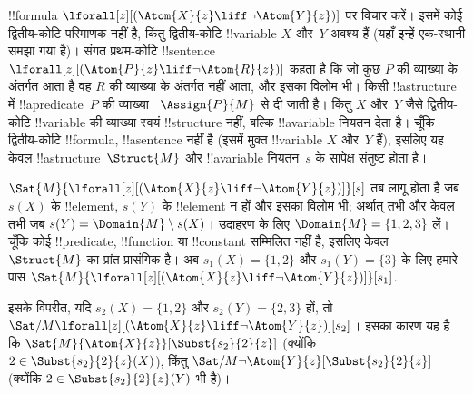 \documentclass[../../../include/open-logic-section]{subfiles}
\begin{document}
\begin{ex}
  !!{formula} $\lforall[z][(\Atom{X}{z} \liff \lnot
    \Atom{Y}{z})]$ पर विचार करें। इसमें कोई द्वितीय-कोटि परिमाणक नहीं है,
  किंतु द्वितीय-कोटि !!{variable} $X$ और~$Y$ अवश्य हैं (यहाँ इन्हें एक-स्थानी
  समझा गया है)। संगत प्रथम-कोटि !!{sentence}
  $\lforall[z][(\Atom{P}{z} \liff \lnot \Atom{R}{z})]$ कहता है कि जो कुछ
  $P$ की व्याख्या के अंतर्गत आता है वह $R$ की व्याख्या के अंतर्गत नहीं आता,
  और इसका विलोम भी। किसी !!a{structure} में !!a{predicate}~$P$ की व्याख्या
  ~$\Assign{P}{M}$ से दी जाती है। किंतु $X$ और~$Y$ जैसे द्वितीय-कोटि
  !!{variable} की व्याख्या स्वयं !!{structure} नहीं, बल्कि !!a{variable}
  नियतन देता है। चूँकि द्वितीय-कोटि !!{formula}, !!a{sentence} नहीं है (इसमें
  मुक्त !!{variable} $X$ और~$Y$ हैं), इसलिए यह केवल !!a{structure}~$\Struct{M}$
  और !!a{variable} नियतन~$s$ के सापेक्ष संतुष्ट होता है।

  $\Sat{M}{\lforall[z][(\Atom{X}{z} \liff \lnot \Atom{Y}{z})]}[s]$
  तब लागू होता है जब~$s(X)$ के !!{element}, $s(Y)$ के !!{element} न हों और
  इसका विलोम भी; अर्थात् तभी और केवल तभी जब $s(Y) = \Domain{M} \setminus
  s(X)$। उदाहरण के लिए $\Domain{M} = \{1, 2, 3\}$ लें। चूँकि कोई
  !!{predicate}, !!{function} या !!{constant} सम्मिलित नहीं है, इसलिए केवल
  ~$\Struct{M}$ का प्रांत प्रासंगिक है। अब $s_1(X) = \{1, 2\}$ और
  $s_1(Y) = \{3\}$ के लिए हमारे पास $\Sat{M}{\lforall[z][(\Atom{X}{z}
      \liff \lnot \Atom{Y}{z})]}[s_1]$.

  इसके विपरीत, यदि $s_2(X) = \{1, 2\}$ और $s_2(Y) = \{2, 3\}$ हों, तो
  $\Sat/{M}{\lforall[z][(\Atom{X}{z} \liff \lnot
      \Atom{Y}{z})]}[s_2]$। इसका कारण यह है कि
  $\Sat{M}{\Atom{X}{z}}[\Subst{s_2}{2}{z}]$ (क्योंकि $2 \in \Subst{s_2}{2}{z}(X)$), किंतु
  $\Sat/{M}{\lnot \Atom{Y}{z}}[\Subst{s_2}{2}{z}]$ (क्योंकि $2 \in
  \Subst{s_2}{2}{z}(Y)$ भी है)।
\end{ex}
\end{document}
